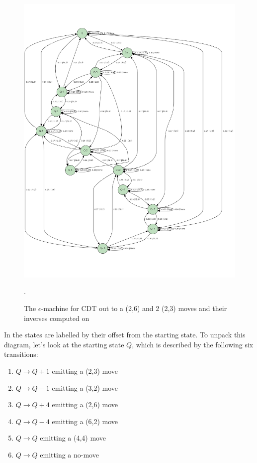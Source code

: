 \documentclass[12pt]{article}
\begin{document}
  \begin{figure}
    \begin{center}
    \includegraphics[width=5in]{eM-CDT.pdf}
    \caption{The $\epsilon$-machine for CDT out to a (2,6) and 2 (2,3) moves and their inverses computed on \cite{getchell_finalproject_2018}}.\label{CDT-eM}
    \end{center}
  \end{figure}

  In  the states are labelled by their offset from the starting state. To unpack this diagram, let's look at the starting state $Q$, which
  is described by the following six transitions:
  
  \begin{enumerate}
    \item[] $Q\rightarrow Q+1$ emitting a (2,3) move
    \item[] $Q\rightarrow Q-1$ emitting a (3,2) move
    \item[] $Q\rightarrow Q+4$ emitting a (2,6) move
    \item[] $Q\rightarrow Q-4$ emitting a (6,2) move
    \item[] $Q\rightarrow Q$ emitting a (4,4) move
    \item[] $Q\rightarrow Q$ emitting a no-move
  \end{enumerate}
\end{document}
